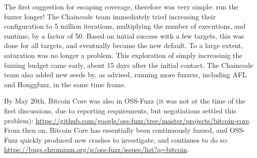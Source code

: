 The first suggestion for escaping coverage, therefore was very simple:  run the fuzzer longer!  The Chaincode team immediately tried increasing their configuration to 5 million iterations, multiplying the number of executions, and runtime, by a factor of 50.  Based on initial success with a few targets, this was done for all targets, and eventually became the new default.  To a large extent, saturation was  no longer a problem.  This exploration of simply increasinig the fuzzing budget came early, about 15 days after the initial contact.  The Chaincode team also added new seeds by, as advised, running more fuzzers, including AFL and Honggfuzz, in the same time frame.

By May 20th, Bitcoin Core was also in OSS-Fuzz (it was not at the time of the first discussions, due to reporting requirements, but negotiations settled this problem): \url{https://github.com/google/oss-fuzz/tree/master/projects/bitcoin-core}.  From then on, Bitcoin Core has essentially been continuously fuzzed, and OSS-Fuzz quickly produced new crashes to investigate, and continues to do so:  \url{https://bugs.chromium.org/p/oss-fuzz/issues/list?q=bitcoin}.
